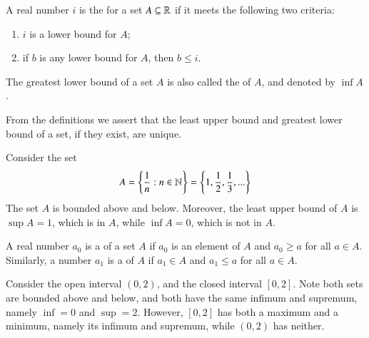 \documentclass[12pt, a4paper, oneside, openright, titlepage]{book}
\begin{document}
\begin{defn}
    A real number $i$ is the  for a set $A \subseteq \mathbb R$ if it meets the following two criteria: \begin{enumerate}
        \item $i$ is a lower bound for $A$;
        \item if $b$ is any lower bound for $A$, then $b \leq i$.
    \end{enumerate}
    The greatest lower bound of a set $A$ is also called the  of $A$, and denoted by $\inf A$.
\end{defn}


\begin{rmk}
    From the definitions we assert that the least upper bound and greatest lower bound of a set, if they exist, are unique.
\end{rmk}


\begin{eg}
    Consider the set $$A = \left\{\frac{1}{n}:n\in\mathbb N\right\} = \left\{1,\frac{1}{2},\frac{1}{3},...\right\}$$ The set $A$ is bounded above and below. Moreover, the least upper bound of $A$ is $\sup A = 1$, which is in $A$, while $\inf A = 0$, which is not in $A$.
\end{eg}


\begin{defn}
    A real number $a_0$ is a  of a set $A$ if $a_0$ is an element of $A$ and $a_0 \geq a$ for all $a \in A$. Similarly, a number $a_1$ is a  of $A$ if $a_1 \in A$ and $a_1 \leq a$ for all $a \in A$.
\end{defn}

\begin{eg}
    Consider the open interval $(0,2)$, and the closed interval $[0,2]$. Note both sets are bounded above and below, and both have the same infimum and supremum, namely $\inf = 0$ and $\sup = 2$. However, $[0,2]$ has both a maximum and a minimum, namely its infimum and supremum, while $(0,2)$ has neither.
\end{eg}
\end{document}

